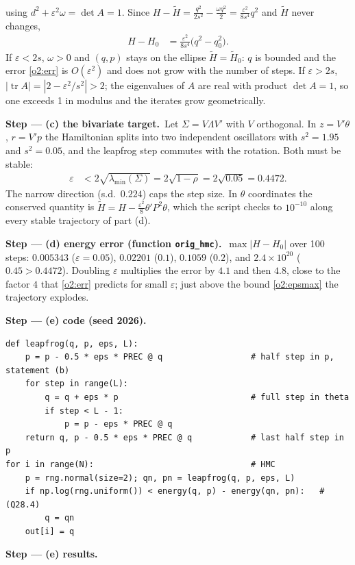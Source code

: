 \documentclass[11pt,a4paper]{article}
\newcommand{\passo}[2]{\par\smallskip\noindent\textbf{Step --- #1.}~#2}
\begin{document}
\begin{sol}
{\begin{align}
\end{align}
using $d^2+\varepsilon^2\omega=\det A=1$. Since $H-\tilde H=\frac{q^2}{2s^2}-\frac{\omega q^2}{2}=\frac{\varepsilon^2}{8s^4}q^2$ and $\tilde H$ never changes,
\begin{align}
H-H_0&=\frac{\varepsilon^2}{8s^4}\big(q^2-q_0^2\big).\label{o2:err}
\end{align}
If $\varepsilon<2s$, $\omega>0$ and $(q,p)$ stays on the ellipse $\tilde H=\tilde H_0$: $q$ is bounded and the error \eqref{o2:err} is $O(\varepsilon^2)$ and does not grow with the number of steps. If $\varepsilon>2s$, $|\operatorname{tr}A|=|2-\varepsilon^2/s^2|>2$; the eigenvalues of $A$ are real with product $\det A=1$, so one exceeds 1 in modulus and the iterates grow geometrically.}
\passo{(c) the bivariate target}{Let $\Sigma=V\Lambda V'$ with $V$ orthogonal. In $z=V'\theta$, $r=V'p$ the Hamiltonian splits into two independent oscillators with $s^2=1.95$ and $s^2=0.05$, and the leapfrog step commutes with the rotation. Both must be stable:
\begin{align}
\varepsilon&<2\sqrt{\lambda_{\min}(\Sigma)}=2\sqrt{1-\rho}=2\sqrt{0.05}=0.4472.\label{o2:epsmax}
\end{align}
The narrow direction (s.d.\ $0.224$) caps the step size. In $\theta$ coordinates the conserved quantity is $\tilde H=H-\frac{\varepsilon^2}{8}\theta'P^2\theta$, which the script checks to $10^{-10}$ along every stable trajectory of part (d).}
\passo{(d) energy error (function \texttt{orig\_hmc})}{$\max|H-H_0|$ over 100 steps: $0.005343$ ($\varepsilon=0.05$), $0.02201$ ($0.1$), $0.1059$ ($0.2$), and $2.4\times10^{20}$ ($0.45>0.4472$). Doubling $\varepsilon$ multiplies the error by $4.1$ and then $4.8$, close to the factor $4$ that \eqref{o2:err} predicts for small $\varepsilon$; just above the bound \eqref{o2:epsmax} the trajectory explodes.}
\passo{(e) code (seed 2026)}{}
\begin{lstlisting}
def leapfrog(q, p, eps, L):
    p = p - 0.5 * eps * PREC @ q                  # half step in p, statement (b)
    for step in range(L):
        q = q + eps * p                           # full step in theta
        if step < L - 1:
            p = p - eps * PREC @ q
    return q, p - 0.5 * eps * PREC @ q            # last half step in p
for i in range(N):                                # HMC
    p = rng.normal(size=2); qn, pn = leapfrog(q, p, eps, L)
    if np.log(rng.uniform()) < energy(q, p) - energy(qn, pn):   # (Q28.4)
        q = qn
    out[i] = q
\end{lstlisting}
\passo{(e) results}{\par
}
\end{sol}
\end{document}
